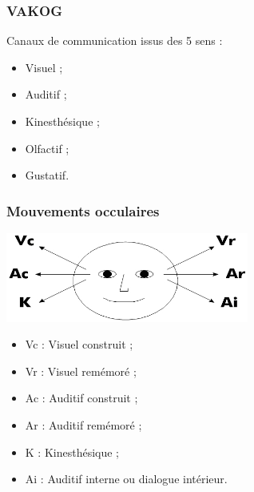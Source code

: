 \documentclass{beamer}
\begin{document}
\begin{frame}
	\frametitle{VAKOG} Canaux de communication issus des 5 sens : 
	\begin{itemize}
		\item Visuel ; 
		\item Auditif ; 
		\item Kinesthésique ; 
		\item Olfactif ; 
		\item Gustatif. 
	\end{itemize}
\end{frame}
\begin{frame}
	\frametitle{Mouvements occulaires} 
	\begin{center}
		\includegraphics[width=8cm]{yeux.jpg} 
	\end{center}
	\begin{itemize}
		\item<+-> Vc : Visuel construit ; 
		\item<+-> Vr : Visuel remémoré ; 
		\item<+-> Ac : Auditif construit ; 
		\item<+-> Ar : Auditif remémoré ; 
		\item<+-> K : Kinesthésique ; 
		\item<+-> Ai : Auditif interne ou dialogue intérieur. 
	\end{itemize}
\end{frame}
\end{document}
